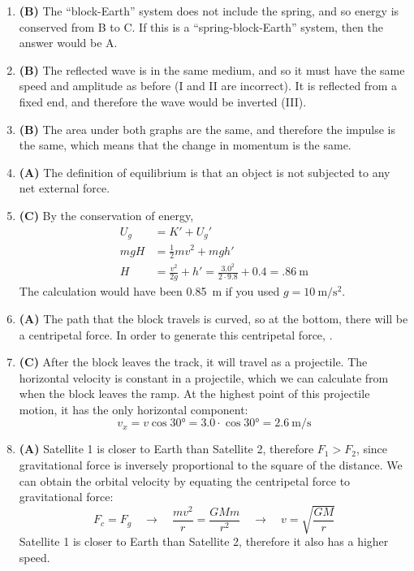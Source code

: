 \documentclass{../../oss-handout}
\begin{document}
\begin{enumerate}[leftmargin=17pt]
\item\textbf{(B)} The ``block-Earth'' system does not include the spring, and
  so energy is conserved from B to C. If this is a ``spring-block-Earth''
  system, then the answer would be A.

\item\textbf{(B)} The reflected wave is in the same medium, and so it must have
  the same speed and amplitude as before (I and II are incorrect). It is
  reflected from a fixed end, and therefore the wave would be inverted (III).

\item\textbf{(B)} The area under both graphs are the same, and therefore the
  impulse is the same, which means that the change in momentum is the same.

\item\textbf{(A)} The definition of equilibrium is that an object is not
  subjected to any net external force.

\item\textbf{(C)} By the conservation of energy,
  \begin{align*}
    U_g &= K'+U_g'\\
    mgH &= \frac12mv^2+mgh'\\
    H &= \frac{v^2}{2g}+h'=\frac{3.0^2}{2\cdot9.8}+0.4=\boxed{\SI{.86}{\metre}}
  \end{align*}
  The calculation would have been \SI{.85}{\metre} if you used
  $g=\SI{10}{\metre\per\second\squared}$.

\item\textbf{(A)} The path that the block travels is curved, so at the bottom,
  there will be a centripetal force. In order to generate this centripetal
  force, .

\item\textbf{(C)} After the block leaves the track, it will travel as a
  projectile. The horizontal velocity is constant in a projectile, which we
  can calculate from when the block leaves the ramp. At the highest point of
  this projectile motion, it has the only horizontal component:
  \begin{displaymath}
    v_x=v\cos\ang{30}=3.0\cdot\cos\ang{30}=
    \boxed{\SI{2.6}{\metre\per\second}}
  \end{displaymath}

\item\textbf{(A)} Satellite 1 is closer to Earth than Satellite 2, therefore
  $F_1>F_2$, since gravitational force is inversely proportional to the square
  of the distance. We can obtain the orbital velocity by equating the
  centripetal force to gravitational force:
  \begin{equation*}
    F_c=F_g\quad\rightarrow\quad
    \frac{mv^2}{r}=\frac{GMm}{r^2}\quad\rightarrow\quad
    v=\sqrt{\frac{GM}{r}}
  \end{equation*}
  Satellite 1 is closer to Earth than Satellite 2, therefore it also has a
  higher speed.
  

\end{enumerate}
\end{document}
